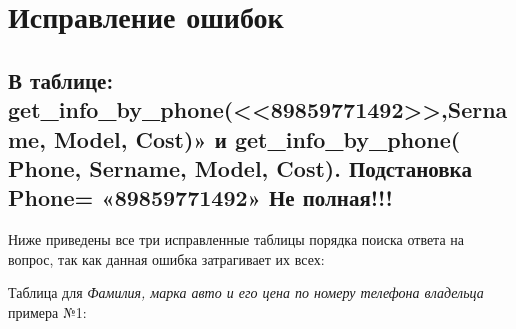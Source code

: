\documentclass[a4paper,12pt]{article}
\begin{document}
	\section*{Исправление ошибок}
	
	\subsection*{В таблице:  get\_info\_by\_phone(<<89859771492>>,Sername, Model, Cost)» и
		get\_info\_by\_phone( Phone, Sername, Model, Cost).
		Подстановка Phone= «89859771492»   Не полная!!!
	}

	Ниже приведены все три исправленные таблицы порядка поиска ответа на вопрос, так как данная ошибка затрагивает их всех:
	
	\newpage
	
	Таблица для \textit{Фамилия, марка авто и его цена по номеру телефона владельца} примера №1:
	
\end{document}
